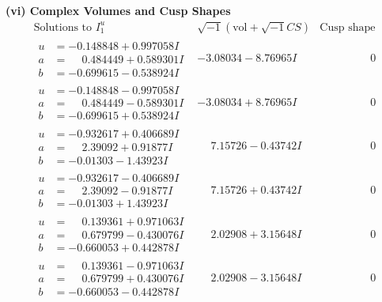 \documentclass[1p]{elsarticle_modified}
\theoremstyle{definition}
\newcommand{\I}{\sqrt{-1}}
\begin{document}
\newpage\flushleft \textbf{(vi) Complex Volumes and Cusp Shapes}
$$\begin{array}{c|c|c}  
\text{Solutions to }I^u_{1}& \I (\text{vol} + \sqrt{-1}CS) & \text{Cusp shape}\\
 \hline 
\begin{aligned}
u &= -0.148848 + 0.997058 I \\
a &= \phantom{-}0.484449 + 0.589301 I \\
b &= -0.699615 - 0.538924 I\end{aligned}
 & -3.08034 - 8.76965 I & \phantom{-0.000000 } 0 \\ \hline\begin{aligned}
u &= -0.148848 - 0.997058 I \\
a &= \phantom{-}0.484449 - 0.589301 I \\
b &= -0.699615 + 0.538924 I\end{aligned}
 & -3.08034 + 8.76965 I & \phantom{-0.000000 } 0 \\ \hline\begin{aligned}
u &= -0.932617 + 0.406689 I \\
a &= \phantom{-}2.39092 + 0.91877 I \\
b &= -0.01303 - 1.43923 I\end{aligned}
 & \phantom{-}7.15726 - 0.43742 I & \phantom{-0.000000 } 0 \\ \hline\begin{aligned}
u &= -0.932617 - 0.406689 I \\
a &= \phantom{-}2.39092 - 0.91877 I \\
b &= -0.01303 + 1.43923 I\end{aligned}
 & \phantom{-}7.15726 + 0.43742 I & \phantom{-0.000000 } 0 \\ \hline\begin{aligned}
u &= \phantom{-}0.139361 + 0.971063 I \\
a &= \phantom{-}0.679799 - 0.430076 I \\
b &= -0.660053 + 0.442878 I\end{aligned}
 & \phantom{-}2.02908 + 3.15648 I & \phantom{-0.000000 } 0 \\ \hline\begin{aligned}
u &= \phantom{-}0.139361 - 0.971063 I \\
a &= \phantom{-}0.679799 + 0.430076 I \\
b &= -0.660053 - 0.442878 I\end{aligned}
 & \phantom{-}2.02908 - 3.15648 I & \phantom{-0.000000 } 0 \\ \hline\begin{aligned}

\end{aligned}
\end{array}$$
\end{document}

